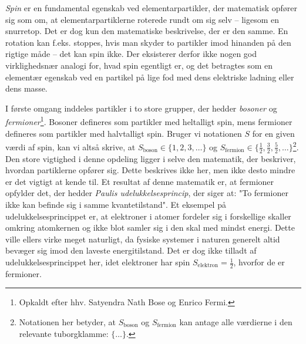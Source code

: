 \textit{Spin} er en fundamental egenskab ved elementarpartikler, der matematisk opfører sig som om, at elementarpartiklerne roterede rundt om sig selv -- ligesom en snurretop. Det er dog kun den matematiske beskrivelse, der er den samme. En rotation kan f.eks. stoppes, hvis man skyder to partikler imod hinanden på den rigtige måde -- det kan spin ikke. Der eksisterer derfor ikke nogen god virklighedsnær analogi for, hvad spin egentligt er, og det betragtes som en elementær egenskab ved en partikel på lige fod med dens elektriske ladning eller dens masse.

I første omgang inddeles partikler i to store grupper, der hedder \emph{bosoner} og \emph{fermioner}\footnote{Opkaldt efter hhv. Satyendra Nath Bose og Enrico Fermi.}. Bosoner defineres som partikler med heltalligt spin, mens fermioner defineres som partikler med halvtalligt spin. Bruger vi notationen $S$ for en given værdi af spin, kan vi altså skrive, at $S_\mathrm{boson} \in \{ 1,2,3,\ldots \}$ og $S_\mathrm{fermion} \in \{ \frac{1}{2},\frac{3}{2},\frac{5}{2},\ldots\}$\footnote{Notationen her betyder, at $S_\mathrm{boson}$ og $S_\mathrm{fermion}$ kan antage alle værdierne i den relevante tuborgklamme: $\{\ldots\}$.}. Den store vigtighed i denne opdeling ligger i selve den matematik, der beskriver, hvordan partiklerne opfører sig. Dette beskrives ikke her, men ikke desto mindre er det vigtigt at kende til. Et resultat af denne matematik er, at fermioner opfylder det, der hedder \emph{Paulis udelukkelsesprincip}, der siger at: "To fermioner ikke kan befinde sig i samme kvantetilstand". Et eksempel på udelukkelsesprincippet er, at elektroner i atomer fordeler sig i forskellige skaller omkring atomkernen og ikke blot samler sig i den skal med mindst energi. Dette ville ellers virke meget naturligt, da fysiske systemer i naturen generelt altid bevæger sig imod den laveste energitilstand. Det er dog ikke tilladt af udelukkelsesprincippet her, idet elektroner har spin $S_\mathrm{elektron} = \frac{1}{2}$, hvorfor de er fermioner.

